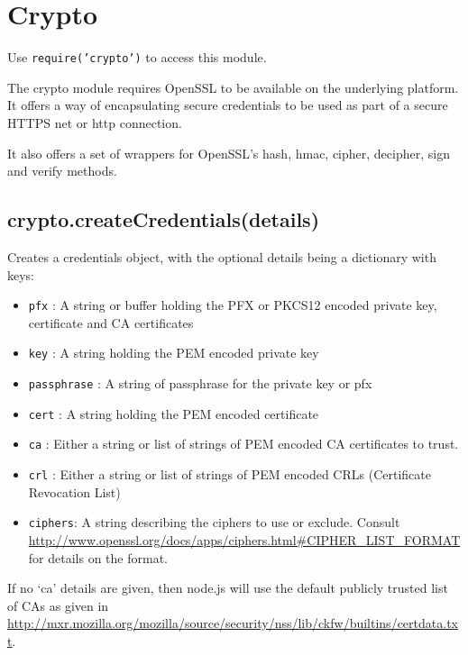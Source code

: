 \section{Crypto}

\begin{Shaded}
\begin{Highlighting}[]
\NormalTok{: } 
\end{Highlighting}
\end{Shaded}

Use \texttt{require('crypto')} to access this module.

The crypto module requires OpenSSL to be available on the underlying
platform. It offers a way of encapsulating secure credentials to be used
as part of a secure HTTPS net or http connection.

It also offers a set of wrappers for OpenSSL's hash, hmac, cipher,
decipher, sign and verify methods.

\subsection{crypto.createCredentials(details)}

Creates a credentials object, with the optional details being a
dictionary with keys:

\begin{itemize}
\item
  \texttt{pfx} : A string or buffer holding the PFX or PKCS12 encoded
  private key, certificate and CA certificates
\item
  \texttt{key} : A string holding the PEM encoded private key
\item
  \texttt{passphrase} : A string of passphrase for the private key or
  pfx
\item
  \texttt{cert} : A string holding the PEM encoded certificate
\item
  \texttt{ca} : Either a string or list of strings of PEM encoded CA
  certificates to trust.
\item
  \texttt{crl} : Either a string or list of strings of PEM encoded CRLs
  (Certificate Revocation List)
\item
  \texttt{ciphers}: A string describing the ciphers to use or exclude.
  Consult
  \url{http://www.openssl.org/docs/apps/ciphers.html#CIPHER_LIST_FORMAT}
  for details on the format.
\end{itemize}

If no `ca' details are given, then node.js will use the default publicly
trusted list of CAs as given in
\url{http://mxr.mozilla.org/mozilla/source/security/nss/lib/ckfw/builtins/certdata.txt}.

